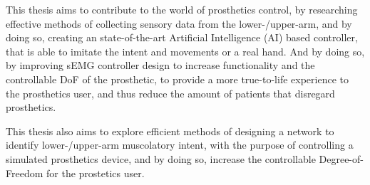 \documentclass[../main.tex]{subfiles}
\begin{document}
This thesis aims to contribute to the world of prosthetics control, by researching effective methods of collecting sensory data from the lower-/upper-arm, and by doing so, creating an state-of-the-art Artificial Intelligence (AI) based controller, that is able to imitate the intent and movements or a real hand.
And by doing so, by improving sEMG controller design to increase functionality and the controllable DoF of the prosthetic, to provide a more true-to-life experience to the prosthetics user, and thus reduce the amount of patients that disregard prosthetics.

This thesis also aims to explore efficient methods of designing a network to identify lower-/upper-arm muscolatory intent, with the purpose of controlling a simulated prosthetics device, and by doing so, increase the controllable Degree-of-Freedom for the prostetics user.

\end{document}
